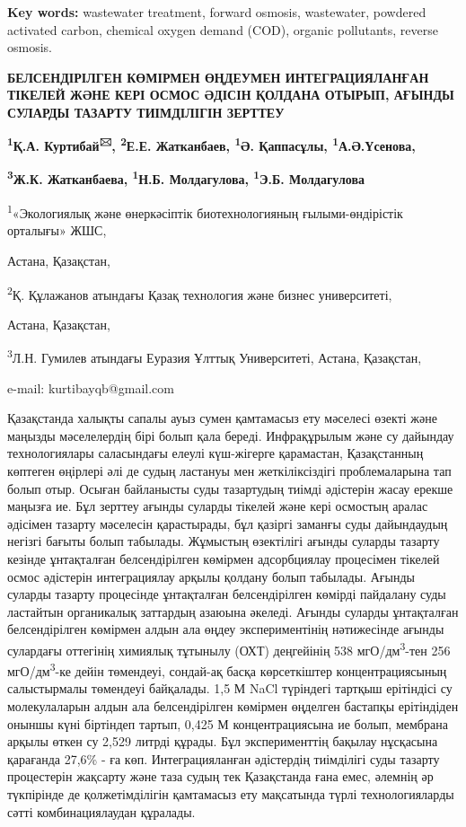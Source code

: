{\bfseries Key words:} wastewater treatment, forward osmosis, wastewater,
powdered activated carbon, chemical oxygen demand (COD), organic
pollutants, reverse osmosis.

{\bfseries БЕЛСЕНДІРІЛГЕН КӨМІРМЕН ӨҢДЕУМЕН ИНТЕГРАЦИЯЛАНҒАН ТІКЕЛЕЙ ЖӘНЕ
КЕРІ ОСМОС ӘДІСІН ҚОЛДАНА ОТЫРЫП, АҒЫНДЫ СУЛАРДЫ ТАЗАРТУ ТИІМДІЛІГІН
ЗЕРТТЕУ}

{\bfseries \textsuperscript{1}Қ.А. Куртибай\textsuperscript{🖂},
\textsuperscript{2}Е.Е. Жатканбаев, \textsuperscript{1}Ә. Қаппасұлы,
\textsuperscript{1}А.Ә.Үсенова,}

{\bfseries \textsuperscript{3}Ж.К. Жатканбаева, \textsuperscript{1}Н.Б.
Молдагулова, \textsuperscript{1}Э.Б. Молдагулова}

\textsuperscript{1}«Экологиялық және өнеркәсіптік биотехнологияның
ғылыми-өндірістік орталығы» ЖШС,

Астана, Қазақстан,

\textsuperscript{2}Қ. Құлажанов атындағы Қазақ технология және бизнес
университеті,

Астана, Қазақстан,

\textsuperscript{3}Л.Н. Гумилев атындағы Еуразия Ұлттық Университеті,
Астана, Қазақстан,

e-mail: kurtibayqb@gmail.com

Қазақстанда халықты сапалы ауыз сумен қамтамасыз ету мәселесі өзекті
және маңызды мәселелердің бірі болып қала береді. Инфрақұрылым және су
дайындау технологиялары саласындағы елеулі күш-жігерге қарамастан,
Қазақстанның көптеген өңірлері әлі де судың ластануы мен жеткіліксіздігі
проблемаларына тап болып отыр. Осыған байланысты суды тазартудың тиімді
әдістерін жасау ерекше маңызға ие. Бұл зерттеу ағынды суларды тікелей
және кері осмостың аралас әдісімен тазарту мәселесін қарастырады, бұл
қазіргі заманғы суды дайындаудың негізгі бағыты болып табылады. Жұмыстың
өзектілігі ағынды суларды тазарту кезінде ұнтақталған белсендірілген
көмірмен адсорбциялау процесімен тікелей осмос әдістерін интеграциялау
арқылы қолдану болып табылады. Ағынды суларды тазарту процесінде
ұнтақталған белсендірілген көмірді пайдалану суды ластайтын органикалық
заттардың азаюына әкеледі. Ағынды суларды ұнтақталған белсендірілген
көмірмен алдын ала өңдеу экспериментінің нәтижесінде ағынды сулардағы
оттегінің химиялық тұтынылу (ОХТ) деңгейінің 538
мгО/дм\textsuperscript{3}-тен 256 мгО/дм\textsuperscript{3}-ке дейін
төмендеуі, сондай-ақ басқа көрсеткіштер концентрациясының салыстырмалы
төмендеуі байқалады. 1,5 М NaCl түріндегі тартқыш ерітіндісі су
молекулаларын алдын ала белсендірілген көмірмен өңделген бастапқы
ерітіндіден оныншы күні біртіндеп тартып, 0,425 М концентрациясына ие
болып, мембрана арқылы өткен су 2,529 литрді құрады. Бұл эксперименттің
бақылау нұсқасына қарағанда 27,6\% - ға көп. Интеграцияланған әдістердің
тиімділігі суды тазарту процестерін жақсарту және таза судың тек
Қазақстанда ғана емес, әлемнің әр түкпірінде де қолжетімділігін
қамтамасыз ету мақсатында түрлі технологияларды сәтті комбинациялаудан
құралады.

